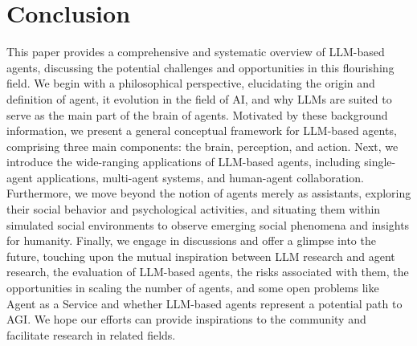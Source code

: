 \section{Conclusion}


This paper provides a comprehensive and systematic overview of LLM-based agents, discussing the potential challenges and opportunities in this flourishing field. 
We begin with a philosophical perspective, elucidating the origin and definition of agent, it evolution in the field of AI, and why LLMs are suited to serve as the main part of the brain of agents. 
Motivated by these background information, we present a general conceptual framework for LLM-based agents, comprising three main components: the brain, perception, and action. Next, we introduce the wide-ranging applications of LLM-based agents, including single-agent applications, multi-agent systems, and human-agent collaboration. Furthermore, we move beyond the notion of agents merely as assistants, exploring their social behavior and psychological activities, and situating them within simulated social environments to observe emerging social phenomena and insights for humanity.
Finally, we engage in discussions and offer a glimpse into the future, touching upon the mutual inspiration between LLM research and agent research, the evaluation of LLM-based agents, the risks associated with them, the opportunities in scaling the number of agents, and some open problems like Agent as a Service and whether LLM-based agents represent a potential path to AGI.
We hope our efforts can provide inspirations to the community and facilitate research in related fields.